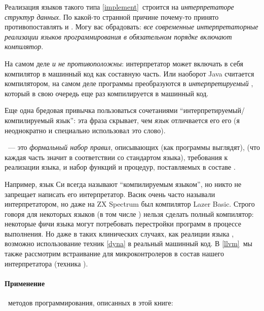 \clearpage
Реализация языков такого типа \ref{implement}\ строится на \emph{интерпретаторе
структур данных}. По какой-то странной причине почему-то принято
противопоставлять  и . Могу вас
обрадовать: \textit{все современные интерпретаторные реализации языков
программирования в обязательном порядке включают компилятор}.

На самом деле
\emph{ и  не противоположны}:
интерпретатор может включать в себя компилятор в машинный код как
составную часть. Или наоборот Java считается компилятором, на самом деле
программы преобразуются в \textit{интерпретируемый} , который в
свою очередь еще раз компилируется в машинный код.

Еще одна бредовая привычка пользоваться сочетаниями
``интерпретируемый/компилируемый язык'': эта фраза скрывает, чем \emph{язык}
отличвается его его  (я неоднократно и специально использовал
это слово).

\ --- это \emph{формальный набор
правил}, описывающих  (как программы выглядят), 
(что каждая часть значит в соответствии со стандартом языка), требования к
 реализации языка, и  набор функций и процедур, поставляемых в составе .

Например, язык Си всегда называют ``компилируемым языком'', но никто не
запрещает написать его интерпретатор. Васик очень часто называли
интерпретатором, но даже на ZX Spectrum был компилятор Lazer Basic. Строго
говоря для некоторых языков (в том числе \hico) нельзя сделать полный
компилятор: некоторые фичи языка могут потребовать перестройки программ в
процессе выполнения. Но даже в таких клинических случаях, как реалиции языка
\lisp, возможно использование техник  \ref{dyna}
в реальный машинный код. В \ref{llvm}\ мы также рассмотрим встраивание
 для микроконтролеров в состав нашего интерпретатора
(техника ).

\clearpage
\paragraph{Применение}\ методов программирования, описанных в этой книге:\\
\bigskip

